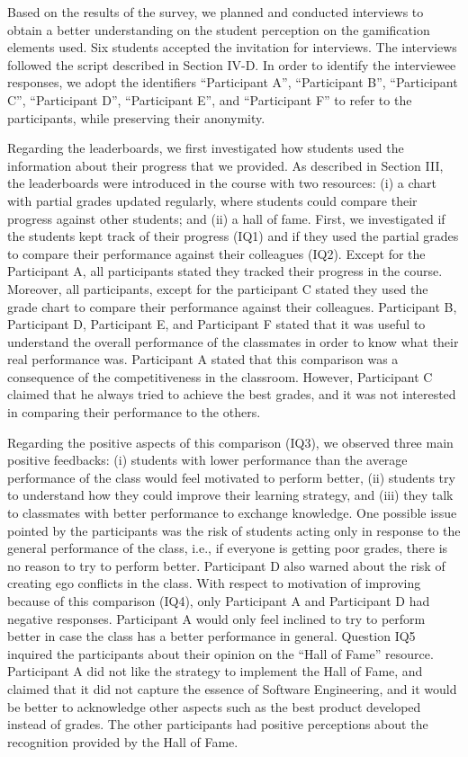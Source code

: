 Based on the results of the survey, we planned and conducted interviews to obtain a better understanding on the student perception on the gamification elements used. Six students accepted the invitation for interviews. The interviews followed the script described in Section IV-D. In order to identify the interviewee responses, we adopt the identifiers “Participant A”, “Participant B”, “Participant C”, “Participant D”, “Participant E”, and “Participant F” to refer to the participants, while preserving their anonymity.

Regarding the leaderboards, we first investigated how students used the information about their progress that we provided. As described in Section III, the leaderboards were introduced in the course with two resources: (i) a chart with partial grades updated regularly, where students could compare their progress against other students; and (ii) a hall of fame. First, we investigated if the students kept track of their progress (IQ1) and if they used the partial grades to compare their performance against their colleagues (IQ2). Except for the Participant A, all participants stated they tracked their progress in the course. Moreover, all participants, except for the participant C stated they used the grade chart to compare their performance against their colleagues. Participant B, Participant D, Participant E, and Participant F stated that it was useful to understand the overall performance of the classmates in order to know what their real performance was. Participant A stated that this comparison was a consequence of the competitiveness in the classroom. However, Participant C claimed that he always tried to achieve the best grades, and it was not interested in comparing their performance to the others.

Regarding the positive aspects of this comparison (IQ3), we observed three main positive feedbacks: (i) students with lower performance than the average performance of the class would feel motivated to perform better, (ii) students try to understand how they could improve their learning strategy, and (iii) they talk to classmates with better performance to exchange knowledge. One possible issue pointed by the participants was the risk of students acting only in response to the general performance of the class, i.e., if everyone is getting poor grades, there is no reason to try to perform better. Participant D also warned about the risk of creating ego conflicts in the class. With respect to motivation of improving because of this comparison (IQ4), only Participant A and Participant D had negative responses. Participant A would only feel inclined to try to perform better in case the class has a better performance in general.
Question IQ5 inquired the participants about their opinion on the “Hall of Fame” resource. Participant A did not like the strategy to implement the Hall of Fame, and claimed that it did not capture the essence of Software Engineering, and it would be better to acknowledge other aspects such as the best product developed instead of grades. The other participants had positive perceptions about the recognition provided by the Hall of Fame.

